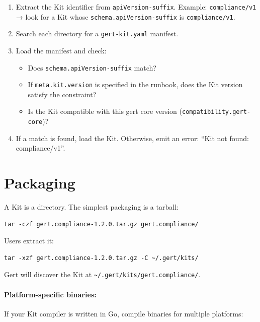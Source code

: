 \begin{enumerate}
  \item Extract the Kit identifier from \texttt{apiVersion-suffix}. Example:
    \texttt{compliance/v1} → look for a Kit whose
    \texttt{schema.apiVersion-suffix} is \texttt{compliance/v1}.
  \item Search each directory for a \texttt{gert-kit.yaml} manifest.
  \item Load the manifest and check:
    \begin{itemize}
      \item Does \texttt{schema.apiVersion-suffix} match?
      \item If \texttt{meta.kit.version} is specified in the runbook, does the
        Kit version satisfy the constraint?
      \item Is the Kit compatible with this gert core version
        (\texttt{compatibility.gert-core})?
    \end{itemize}
  \item If a match is found, load the Kit. Otherwise, emit an error: ``Kit not
    found: compliance/v1''.
\end{enumerate}

\section{Packaging}
\label{sec:packaging}

A Kit is a directory. The simplest packaging is a tarball:

\begin{verbatim}
tar -czf gert.compliance-1.2.0.tar.gz gert.compliance/
\end{verbatim}

Users extract it:

\begin{verbatim}
tar -xzf gert.compliance-1.2.0.tar.gz -C ~/.gert/kits/
\end{verbatim}

Gert will discover the Kit at \texttt{\textasciitilde/.gert/kits/gert.compliance/}.

\paragraph{Platform-specific binaries:}

If your Kit compiler is written in Go, compile binaries for multiple platforms:

